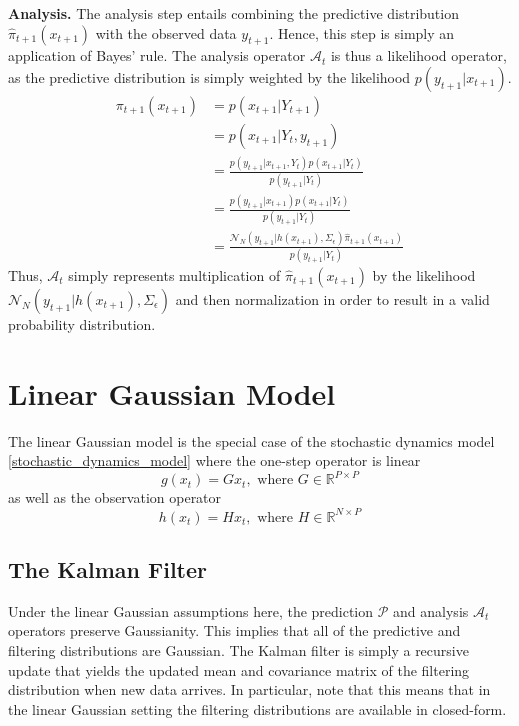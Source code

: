 \documentclass[12pt]{article}
\newcommand{\R}{\mathbb{R}}
\begin{document}
\bigskip
\noindent
\textbf{Analysis.} The analysis step entails combining the predictive distribution $\hat{\pi}_{t+1}(x_{t+1})$ with the observed data $y_{t+1}$. Hence, this step 
is simply an application of Bayes' rule. The analysis operator $\mathcal{A}_t$ is thus a likelihood operator, as the predictive distribution is simply weighted by 
the likelihood $p(y_{t+1}|x_{t+1})$. 
\begin{align}
\pi_{t+1}(x_{t+1}) &= p(x_{t+1}|Y_{t+1}) \nonumber \\
			   &= p(x_{t+1}|Y_t, y_{t+1}) \nonumber \\
			   &= \frac{p(y_{t+1}|x_{t+1}, Y_t)p(x_{t+1}|Y_t)}{p(y_{t+1}|Y_t)} \nonumber \\
			   &= \frac{p(y_{t+1}|x_{t+1})p(x_{t+1}|Y_t)}{p(y_{t+1}|Y_t)} \nonumber \\
			   &= \frac{\mathcal{N}_N(y_{t+1}|h(x_{t+1}), \Sigma_{\epsilon}) \hat{\pi}_{t+1}(x_{t+1})}{p(y_{t+1}|Y_t)} \label{analysis_operator}
\end{align}
Thus, $\mathcal{A}_t$ simply represents multiplication of $\hat{\pi}_{t+1}(x_{t+1})$ by the likelihood $\mathcal{N}_N(y_{t+1}|h(x_{t+1}), \Sigma_{\epsilon})$
and then normalization in order to result in a valid probability distribution. 

\section{Linear Gaussian Model}
The linear Gaussian model is the special case of the stochastic dynamics model \ref{stochastic_dynamics_model} where the one-step operator is linear 
\[g(x_t) = Gx_t, \text{ where } G \in \R^{P \times P}\]
as well as the observation operator 
\[h(x_t) = Hx_t, \text{ where } H \in \R^{N \times P}\]

\subsection{The Kalman Filter}
Under the linear Gaussian assumptions here, the prediction $\mathcal{P}$ and analysis $\mathcal{A}_t$ operators preserve Gaussianity. This implies that 
all of the predictive and filtering distributions are Gaussian. The Kalman filter is simply a recursive update that yields the updated mean and covariance matrix 
of the filtering distribution when new data arrives. In particular, note that this means that in the linear Gaussian setting the filtering distributions are available in 
closed-form. 
\end{document}
